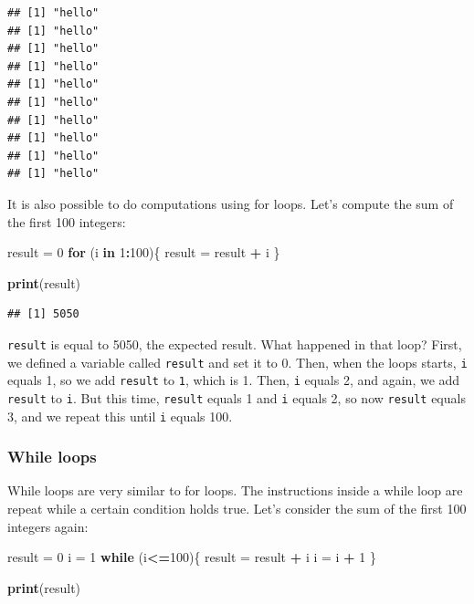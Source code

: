 \documentclass[]{gitbook}
\newenvironment{Shaded}{\begin{snugshade}}{\end{snugshade}}
\newcommand{\ControlFlowTok}[1]{\textcolor[rgb]{0.13,0.29,0.53}{\textbf{#1}}}
\newcommand{\DecValTok}[1]{\textcolor[rgb]{0.00,0.00,0.81}{#1}}
\newcommand{\KeywordTok}[1]{\textcolor[rgb]{0.13,0.29,0.53}{\textbf{#1}}}
\newcommand{\NormalTok}[1]{#1}
\newcommand{\OperatorTok}[1]{\textcolor[rgb]{0.81,0.36,0.00}{\textbf{#1}}}
\newcommand{\StringTok}[1]{\textcolor[rgb]{0.31,0.60,0.02}{#1}}
\theoremstyle{definition}
\theoremstyle{definition}
\theoremstyle{definition}
\theoremstyle{remark}
\begin{document}
\begin{verbatim}
## [1] "hello"
## [1] "hello"
## [1] "hello"
## [1] "hello"
## [1] "hello"
## [1] "hello"
## [1] "hello"
## [1] "hello"
## [1] "hello"
## [1] "hello"
\end{verbatim}

It is also possible to do computations using for loops. Let's compute
the sum of the first 100 integers:

\begin{Shaded}
\begin{Highlighting}[]
\NormalTok{result =}\StringTok{ }\DecValTok{0}
\ControlFlowTok{for}\NormalTok{ (i }\ControlFlowTok{in} \DecValTok{1}\OperatorTok{:}\DecValTok{100}\NormalTok{)\{}
\NormalTok{  result =}\StringTok{ }\NormalTok{result }\OperatorTok{+}\StringTok{ }\NormalTok{i}
\NormalTok{\}}

\KeywordTok{print}\NormalTok{(result)}
\end{Highlighting}
\end{Shaded}

\begin{verbatim}
## [1] 5050
\end{verbatim}

\texttt{result} is equal to 5050, the expected result. What happened in
that loop? First, we defined a variable called \texttt{result} and set
it to 0. Then, when the loops starts, \texttt{i} equals 1, so we add
\texttt{result} to \texttt{1}, which is 1. Then, \texttt{i} equals 2,
and again, we add \texttt{result} to \texttt{i}. But this time,
\texttt{result} equals 1 and \texttt{i} equals 2, so now \texttt{result}
equals 3, and we repeat this until \texttt{i} equals 100.

\hypertarget{while-loops}{%
\subsubsection{While loops}\label{while-loops}}

While loops are very similar to for loops. The instructions inside a
while loop are repeat while a certain condition holds true. Let's
consider the sum of the first 100 integers again:

\begin{Shaded}
\begin{Highlighting}[]
\NormalTok{result =}\StringTok{ }\DecValTok{0}
\NormalTok{i =}\StringTok{ }\DecValTok{1}
\ControlFlowTok{while}\NormalTok{ (i}\OperatorTok{<=}\DecValTok{100}\NormalTok{)\{}
\NormalTok{  result =}\StringTok{ }\NormalTok{result }\OperatorTok{+}\StringTok{ }\NormalTok{i}
\NormalTok{  i =}\StringTok{ }\NormalTok{i }\OperatorTok{+}\StringTok{ }\DecValTok{1}
\NormalTok{\}}

\KeywordTok{print}\NormalTok{(result)}
\end{Highlighting}
\end{Shaded}
\end{document}
